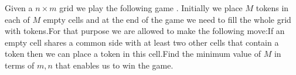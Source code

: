 Given a $n\times m$ grid we play the following game . Initially we place $M$ tokens in each of $M$ empty cells and at the end of the game we need to fill the whole grid with tokens.For that purpose  we are allowed to make the following move:If an empty cell shares a common side with at least two other cells that contain a token then we can place a token in this cell.Find the minimum value of $M$ in terms of $m,n$ that enables us to win the game.